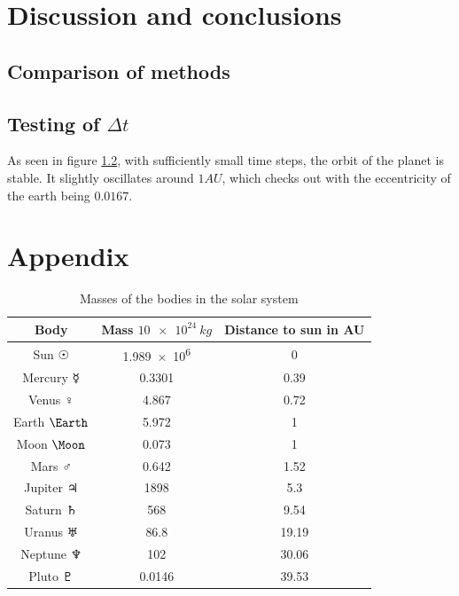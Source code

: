 \documentclass[10pt]{article}
\begin{document}
\begin{multicols}{2}
\section{Discussion and conclusions}



\subsection{Comparison of methods}


\subsection{Testing of $\Delta t$}
As seen in figure \cref{}, with sufficiently small time steps, the orbit
of the planet is stable. It slightly oscillates around $1AU$, which checks
out with the eccentricity of the earth being $0.0167$.



\section*{Appendix}
\begin{table}[H]
    \caption{Masses of the bodies in the solar system}
    \centering
    \begin{tabular}{| c | c | c | }
        \hline
        Body & Mass $\SI{10e24}{kg}$ & Distance to sun in AU\\
        \hline
        Sun      $\Sun$   & \SI{1.989e6}{}&  0 \\
        Mercury  $\Mercury$ & 0.3301    &  0.39 \\
        Venus    $\Venus$   & 4.867     &  0.72 \\
        Earth    $\Earth$   & 5.972     &  1 \\
        Moon     $\Moon$    & 0.073     &  1 \\
        Mars     $\Mars$    & 0.642     &  1.52 \\
        Jupiter  $\Jupiter$ & 1898      &  5.3 \\
        Saturn   $\Saturn$  & 568       &  9.54 \\
        Uranus   $\Uranus$  & 86.8      & 19.19 \\
        Neptune  $\Neptune$ & 102       & 30.06 \\
        Pluto    $\Pluto$   & 0.0146    & 39.53 \\
        \hline
    \end{tabular}
    \label{tab:CelestialMasses}
\end{table}


{}


\end{multicols}
\end{document}
